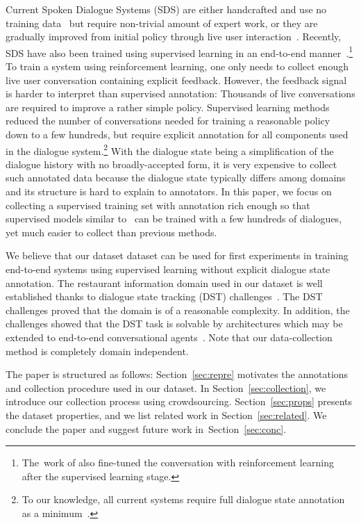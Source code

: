 \documentclass[runningheads,a4paper]{llncs}
\begin{document}
Current Spoken Dialogue Systems (SDS) are either handcrafted and use no training data~\cite{duvsek2014alex,raux2005let} but require non-trivial amount of expert work, or they are gradually improved from initial policy through live user interaction~\cite{young2010hidden,gasic2011line}.
Recently, SDS have also been trained using supervised learning in an end-to-end manner~\cite{wen2016network,williams2016end}.\footnote{The~work of \cite{williams2016end} also fine-tuned the conversation with reinforcement learning after the supervised learning stage.}
To train a system using reinforcement learning, one only needs to collect enough live user conversation containing explicit feedback.
However, the feedback signal is harder to interpret than supervised annotation: Thousands of live conversations are required to improve a rather simple policy.\cite{gasic2011line}
Supervised learning methods reduced the number of conversations needed for training a reasonable policy down to a few hundreds\cite{wen2016network}, but require explicit annotation for all components used in the dialogue system.\footnote{To our knowledge, all current systems require full dialogue state annotation as a minimum~\cite{wen2016network,young2010hidden}.}
With the dialogue state being a simplification of the dialogue history with no broadly-accepted form, it is very expensive to collect such annotated data because the dialogue state typically differs among domains and its structure is hard to explain to annotators.
In this paper, we focus on collecting a supervised training set with annotation rich enough so that supervised models similar to~\cite{wen2016network} can be trained with a few hundreds of dialogues, yet much easier to collect than previous methods.

We believe that our dataset dataset can be used for first experiments in training end-to-end systems using supervised learning without explicit dialogue state annotation.
The restaurant information domain used in our dataset is well established thanks to dialogue state tracking (DST) challenges~\cite{williams2013dstc1,henderson2014dstc2,henderson2014dstc3}. 
The DST challenges proved that the domain is of a reasonable complexity.
In addition, the challenges showed that the DST task is solvable by architectures which may be extended to end-to-end conversational agents~\cite{platek2016recurrent,vodolan2015hybrid,henderson2014word}.
Note that our data-collection method is completely domain independent.

The paper is structured as follows: Section~\ref{sec:repre} motivates the annotations and collection procedure used in our dataset.
In Section~\ref{sec:collection}, we introduce our collection process using crowdsourcing.
Section~\ref{sec:props} presents the dataset properties, and we list related work in Section~\ref{sec:related}.
We conclude the paper and suggest future work in~Section~\ref{sec:conc}.
\end{document}
